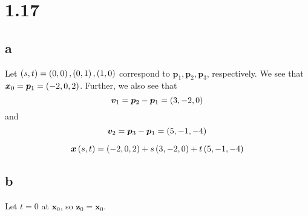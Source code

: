 \documentclass{article}
\begin{document}
\section*{1.17}

\subsection*{a}

Let $\left ( s, t \right) = \left ( 0, 0 \right), \left ( 0, 1 \right), \left ( 1, 0 \right)$ correspond to $\bm{p}_1, \bm{p}_2, \bm{p}_3$, respectively.
We see that $\bm{x}_0 = \bm{p}_1 = \left ( -2, 0, 2 \right)$.
Further, we also see that $$\bm{v}_1 = \bm{p}_2 - \bm{p}_1 = \left ( 3, -2, 0 \right)$$ and $$\bm{v}_2 = \bm{p}_3 - \bm{p}_1 = \left ( 5, -1, -4 \right)$$

$$
\bm{x} \left ( s, t \right) = \left ( -2, 0, 2 \right) + s \left ( 3, -2, 0 \right) + t \left ( 5, -1, -4 \right)
$$

\subsection*{b}

Let $t=0$ at $\bm{x}_0$, so $\bm{z}_0 = \bm{x}_0$.
\end{document}
